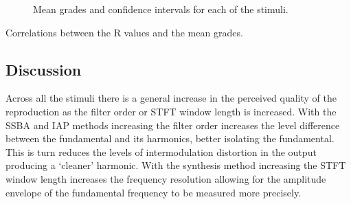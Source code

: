 \begin{figure}[h!]
			\quad
			\caption{Mean grades and confidence intervals for each of the stimuli.}
			\label{fig:SMCResults}
		\end{figure}

		\begin{table}[h!]
			\centering
			
			\caption{Correlations between the R values and the mean grades.}
			\label{fig:SMCCorrelations}
		\end{table}

	\subsection{Discussion}
	\label{sec:PerceptualExperiments-Reconstruction-Discussion}
		Across all the stimuli there is a general increase in the perceived quality of the reproduction as the
		filter order or STFT window length is increased. With the SSBA and IAP methods increasing the filter order
		increases the level difference between the fundamental and its harmonics, better isolating the fundamental.
		This is turn reduces the levels of intermodulation distortion in the output producing a `cleaner' harmonic.
		With the synthesis method increasing the STFT window length increases the frequency resolution allowing for
		the amplitude envelope of the fundamental frequency to be measured more precisely.

